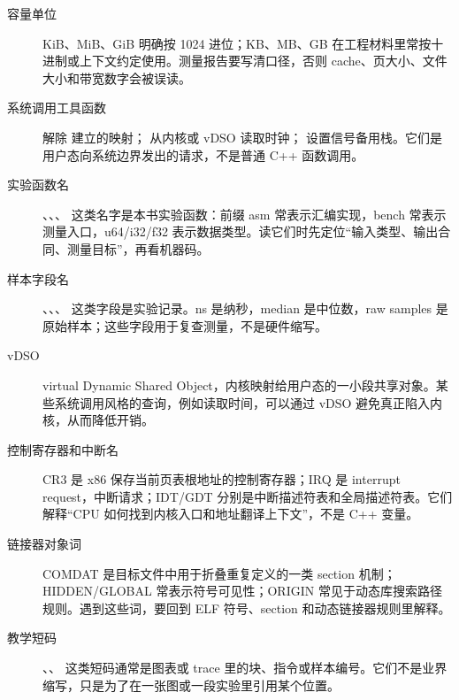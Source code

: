 \begin{description}
  \item[容量单位] KiB、MiB、GiB 明确按 1024 进位；KB、MB、GB 在工程材料里常按十进制或上下文约定使用。测量报告要写清口径，否则 cache、页大小、文件大小和带宽数字会被误读。
  \item[系统调用工具函数]  解除  建立的映射； 从内核或 vDSO 读取时钟； 设置信号备用栈。它们是用户态向系统边界发出的请求，不是普通 C++ 函数调用。
  \item[实验函数名] 、、、 这类名字是本书实验函数：前缀 asm 常表示汇编实现，bench 常表示测量入口，u64/i32/f32 表示数据类型。读它们时先定位“输入类型、输出合同、测量目标”，再看机器码。
  \item[样本字段名] 、、、 这类字段是实验记录。ns 是纳秒，median 是中位数，raw samples 是原始样本；这些字段用于复查测量，不是硬件缩写。
  \item[vDSO] virtual Dynamic Shared Object，内核映射给用户态的一小段共享对象。某些系统调用风格的查询，例如读取时间，可以通过 vDSO 避免真正陷入内核，从而降低开销。
  \item[控制寄存器和中断名] CR3 是 x86 保存当前页表根地址的控制寄存器；IRQ 是 interrupt request，中断请求；IDT/GDT 分别是中断描述符表和全局描述符表。它们解释“CPU 如何找到内核入口和地址翻译上下文”，不是 C++ 变量。
  \item[链接器对象词] COMDAT 是目标文件中用于折叠重复定义的一类 section 机制；HIDDEN/GLOBAL 常表示符号可见性；ORIGIN 常见于动态库搜索路径规则。遇到这些词，要回到 ELF 符号、section 和动态链接器规则里解释。
  \item[教学短码] 、、 这类短码通常是图表或 trace 里的块、指令或样本编号。它们不是业界缩写，只是为了在一张图或一段实验里引用某个位置。
\end{description}
